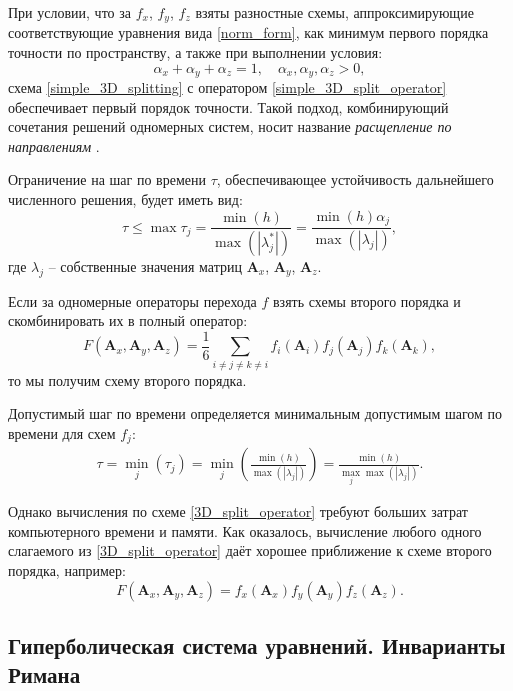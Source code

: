 	При условии, что за $f_x$, $f_y$, $f_z$ взяты разностные схемы, аппроксимирующие соответствующие уравнения вида \eqref{norm_form}, как минимум первого порядка точности по пространству, а также при выполнении условия:
\begin{equation}
	\label{simple_3D_split_cond}
	\alpha_x + \alpha_y + \alpha_z = 1, \quad \alpha_x, \alpha_y, \alpha_z > 0,
\end{equation}
	схема \eqref{simple_3D_splitting} с оператором \eqref{simple_3D_split_operator} обеспечивает первый порядок точности.
	Такой подход, комбинирующий сочетания решений одномерных систем, носит название \textit{расщепление по направлениям} \cite{chelnokov}.
	
	Ограничение на шаг по времени $\tau$, обеспечивающее устойчивость дальнейшего численного решения, будет иметь вид:
\begin{equation}
\tau \le \max{\tau_j} = \frac{\min(h)}{\max(|\lambda_j^*|)} = \frac{\min(h)\alpha_j}{\max(|\lambda_j|)},
\end{equation}
	где $\lambda_j$ -- собственные значения матриц $\mathbf{A}_x$, $\mathbf{A}_y$, $\mathbf{A}_z$.
	
	Если за одномерные операторы перехода $f$ взять схемы второго порядка и скомбинировать их в полный оператор:
\begin{equation}
	\label{3D_split_operator}
	F(\mathbf{A}_x, \mathbf{A}_y, \mathbf{A}_z) = \frac{1}{6}\sum_{i \neq j \neq k \neq i} f_i(\mathbf{A}_i)f_j(\mathbf{A}_j)f_k(\mathbf{A}_k),
\end{equation}
	то мы получим схему второго порядка. 
	
	Допустимый шаг по времени определяется минимальным допустимым шагом по времени для схем $f_j$:
\begin{align}
\tau = \min\limits_{j}(\tau_j) = \min\limits_{j}(\frac{\min(h)}{\max(|\lambda_j|)}) = \frac{\min(h)}{\max\limits_{j}\max(|\lambda_j|)}.
\end{align}
	
	Однако вычисления по схеме \eqref{3D_split_operator} требуют больших затрат компьютерного времени и памяти.
	Как оказалось, вычисление любого одного слагаемого из \eqref{3D_split_operator} даёт хорошее приближение к схеме второго порядка, например:	
\begin{equation}
	\label{short_3D_split_operator}
	F(\mathbf{A}_x, \mathbf{A}_y, \mathbf{A}_z) = f_x(\mathbf{A}_x)f_y(\mathbf{A}_y)f_z(\mathbf{A}_z).
\end{equation}
	
\subsection{Гиперболическая система уравнений. Инварианты Римана}
	
